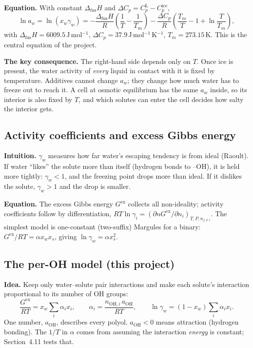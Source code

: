 \documentclass[11pt,a4paper]{article}
\newcommand{\dfus}{\Delta_{\mathrm{fus}}}
\newcommand{\aoh}{a_{\mathrm{OH}}}
\begin{document}
\textbf{Equation.} With constant $\dfus H$ and $\Delta C_p=C_p^{\mathrm{L}}-C_p^{\mathrm{ice}}$,
\begin{equation}
\ln a_w = \ln(x_w\gamma_w) = -\frac{\dfus H}{R}\left(\frac1T-\frac1{T_m}\right)-\frac{\Delta C_p}{R}\left(\frac{T_m}{T}-1+\ln\frac{T}{T_m}\right),
\label{eq:sle}
\end{equation}
with $\dfus H=6009.5$\,J\,mol$^{-1}$, $\Delta C_p=37.9$\,J\,mol$^{-1}$\,K$^{-1}$, $T_m=273.15$\,K. This is the central
equation of the project.

\begin{idea}
\textbf{The key consequence.} The right-hand side depends only on $T$. Once ice is present, the water activity of
\emph{every} liquid in contact with it is fixed by temperature. Additives cannot change $a_w$; they change how much
water has to freeze out to reach it. A cell at osmotic equilibrium has the same $a_w$ inside, so its interior is
also fixed by $T$, and which solutes can enter the cell decides how salty the interior gets.
\end{idea}

\subsection{Activity coefficients and excess Gibbs energy}
\textbf{Intuition.} $\gamma_w$ measures how far water's escaping tendency is from ideal (Raoult). If water ``likes''
the solute more than itself (hydrogen bonds to --OH), it is held more tightly: $\gamma_w<1$, and the freezing point
drops more than ideal. If it dislikes the solute, $\gamma_w>1$ and the drop is smaller.

\textbf{Equation.} The excess Gibbs energy $G^{\mathrm{ex}}$ collects all non-ideality; activity coefficients follow
by differentiation, $RT\ln\gamma_i=(\partial nG^{\mathrm{ex}}/\partial n_i)_{T,P,n_{j\ne i}}$. The simplest model is
one-constant (two-suffix) Margules for a binary: $G^{\mathrm{ex}}/RT=\alpha x_wx_s$, giving
$\ln\gamma_w=\alpha x_s^2$.

\subsection{The per-OH model (this project)}
\textbf{Idea.} Keep only water--solute pair interactions and make each solute's interaction proportional to its
number of OH groups:
\begin{equation}
\frac{G^{\mathrm{ex}}}{RT}=x_w\sum_i\alpha_ix_i,\qquad \alpha_i=\frac{n_{\mathrm{OH},i}\,\aoh}{RT},\qquad
\ln\gamma_w=(1-x_w)\sum_i\alpha_ix_i .
\label{eq:model}
\end{equation}
One number, $\aoh$, describes every polyol. $\aoh<0$ means attraction (hydrogen bonding). The $1/T$ in $\alpha$
comes from assuming the interaction \emph{energy} is constant; Section~4.11 tests that.
\end{document}
